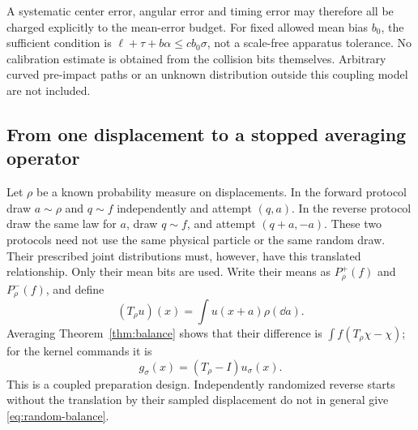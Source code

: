 A systematic center error, angular error and timing error may therefore
all be charged explicitly to the mean-error budget. For fixed allowed
mean bias $b_0$, the sufficient condition is
$\ell+\tau+b\alpha\le c b_0\sigma$, not a scale-free apparatus
tolerance. No calibration estimate is obtained from the collision bits
themselves. Arbitrary curved pre-impact paths or an unknown distribution
outside this coupling model are not included.

\subsection{From one displacement to a stopped averaging operator}
Let $\rho$ be a known probability measure on displacements. In the
forward protocol draw $a\sim\rho$ and $q\sim f$ independently and
attempt $(q,a)$. In the reverse protocol draw the same law for $a$, draw
$q\sim f$, and attempt $(q+a,-a)$. These two protocols need not use
the same physical particle or the same random draw. Their prescribed
joint distributions must, however, have this translated relationship.
Only their mean bits are used. Write their means as $P_\rho^+(f)$ and
$P_\rho^-(f)$, and define
\[
 (T_\rho u)(x)=\int u(x+a)\rho(\dd a).
\]
Averaging Theorem~\ref{thm:balance} shows that their difference is
$\int f(T_\rho\chi-\chi)$; for the kernel commands it is
\begin{equation}\label{eq:random-balance}
       g_\sigma(x)=(T_\rho-I)u_\sigma(x).
\end{equation}
This is a coupled preparation design. Independently randomized reverse
starts without the translation by their sampled displacement do not
in general give \eqref{eq:random-balance}.

